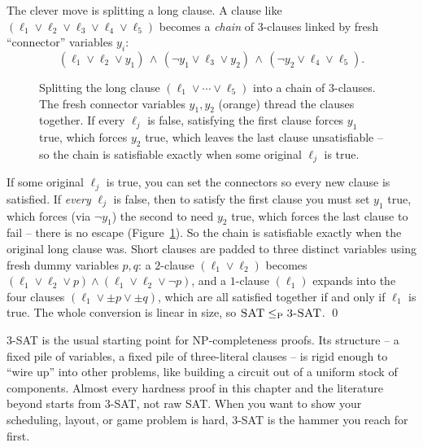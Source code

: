The clever move is splitting a long clause. A clause like $(\ell_1 \vee \ell_2
\vee \ell_3 \vee \ell_4 \vee \ell_5)$ becomes a \emph{chain} of 3-clauses linked
by fresh ``connector'' variables $y_i$:
\[
  (\ell_1 \vee \ell_2 \vee y_1)\,\wedge\,
  (\neg y_1 \vee \ell_3 \vee y_2)\,\wedge\,
  (\neg y_2 \vee \ell_4 \vee \ell_5).
\]
\begin{figure}[h]
\centering
{}
\caption{Splitting the long clause $(\ell_1\vee\cdots\vee\ell_5)$ into a chain of
$3$-clauses. The fresh connector variables $y_1,y_2$ (orange) thread the clauses
together. If every $\ell_j$ is false, satisfying the first clause forces $y_1$
true, which forces $y_2$ true, which leaves the last clause unsatisfiable -- so
the chain is satisfiable exactly when some original $\ell_j$ is true.}
\label{ch33:chain-fig}
\end{figure}

If some original $\ell_j$ is true, you can set the connectors so
every new clause is satisfied. If \emph{every} $\ell_j$ is false, then to satisfy
the first clause you must set $y_1$ true, which forces (via $\neg y_1$) the second
to need $y_2$ true, which forces the last clause to fail -- there is no escape (Figure~\ref{ch33:chain-fig}). So
the chain is satisfiable exactly when the original long clause was. Short clauses
are padded to three distinct variables using fresh dummy variables $p, q$: a
$2$-clause $(\ell_1 \vee \ell_2)$ becomes $(\ell_1 \vee \ell_2 \vee p) \wedge
(\ell_1 \vee \ell_2 \vee \neg p)$, and a $1$-clause $(\ell_1)$ expands into the
four clauses $(\ell_1 \vee \pm p \vee \pm q)$, which are all satisfied together if
and only if $\ell_1$ is true. The whole conversion is linear in size, so
$\textsc{SAT}\le_{\mathrm{P}}\textsc{3-SAT}$. \qed

\begin{aestheticbox}
\textsc{3-SAT} is the usual starting point for NP-completeness proofs. Its structure -- a
fixed pile of variables, a fixed pile of three-literal clauses -- is rigid
enough to ``wire up'' into other problems, like building a circuit out of a
uniform stock of components. Almost every hardness proof in this chapter and the
literature beyond starts from \textsc{3-SAT}, not raw \textsc{SAT}. When you want
to show your scheduling, layout, or game problem is hard, \textsc{3-SAT} is the
hammer you reach for first.
\end{aestheticbox}

